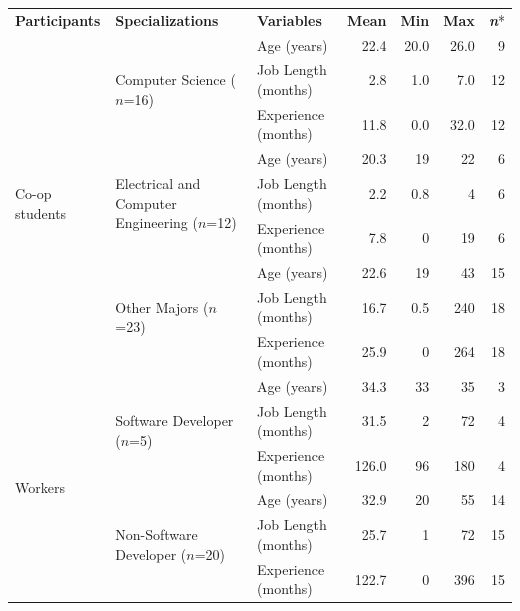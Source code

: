 \documentclass[smallextended]{svjour3}
\begin{document}
\begin{center}
\begin{table}[t]
\renewcommand{\arraystretch}{1.4} 
   \centering
	\label{tbl:demographics}
	
   \begin{tabularx}{\linewidth}{p{17mm}p{27mm}Xrrrr}
   		\textbf{Participants}&\textbf{Specializations}&\textbf{Variables} &\textbf{Mean}&\textbf{Min}&\textbf{Max}&\textbf{\textit{n}}*\\	
		\cline{1-7} 
		\multirow{9}{15mm}{Co-op students} & \multirow{3}{25mm}{Computer Science ($n$=16) } & Age (years) & 22.4  & 20.0  & 26.0  & 9 \\
          & & Job Length (months) & 2.8   & 1.0   & 7.0   & 12 \\
          & & Experience (months) & 11.8  & 0.0   & 32.0  & 12 \\
					\cline{2-7}
					
          & \multirow{3}{25mm}{Electrical and Computer Engineering ($n$=12)} & Age (years) & 20.3  & 19  & 22  & 6 \\
          &  & Job Length (months) & 2.2   & 0.8   & 4   & 6 \\
          &  & Experience (months) & 7.8  & 0   & 19  & 6 \\
					\cline{2-7}
					
          & \multirow{3}{25mm}{Other Majors ($n$=23)} & Age (years) & 22.6  & 19  & 43  & 15 \\
          &  & Job Length (months) & 16.7  & 0.5   & 240  & 18 \\
          &       & Experience (months) & 25.9  & 0   & 264  & 18 \\
 
 		\cline{1-7} 
 
    \multirow{6}{15mm}{Workers}  & \multirow{3}{25mm}{Software Developer ($n$=5)} & Age (years) & 34.3	& 33 & 35 & 3 \\
          &  & Job Length (months) & 31.5 & 2 & 72 & 4 \\
          &       & Experience (months) & 126.0 & 96 & 180 & 4 \\
                   
          \cline{2-7}
          & \multirow{3}{25mm}{Non-Software Developer ($n$=20)} & Age (years) & 32.9 & 20 & 55 & 14 \\
          &  & Job Length (months) & 25.7 & 1 & 72 & 15 \\
     	  &       & Experience (months) & 122.7 & 0 & 396 & 15 \\	
	\end{tabularx}
\end{table}
\end{center}
\end{document}
